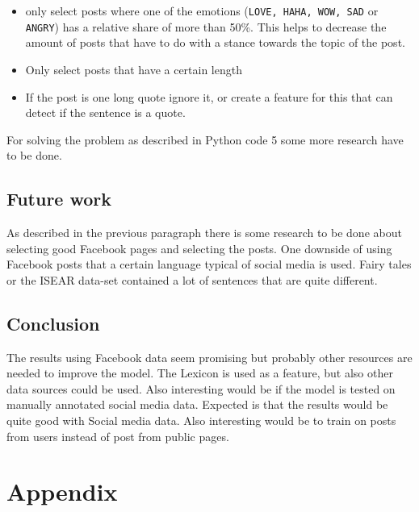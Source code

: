 \documentclass[
10pt, %
a4paper, %
oneside, %
headinclude,footinclude, %
BCOR5mm, %
]{scrartcl}
\begin{document}
\begin{itemize}
\item only select posts where one of the emotions (\texttt{LOVE, HAHA, WOW, SAD} or \texttt{ANGRY}) has a relative share of more than 50\%. This helps to decrease the amount of posts that have to do with a stance towards the topic of the post.
\item Only select posts that have a certain length
\item If the post is one long quote ignore it, or create a feature for this that can detect if the sentence is a quote.
\end{itemize}
For solving the problem as described in Python code 5 some more research have to be done. 


\subsection{Future work}
As described in the previous paragraph there is some research to be done about selecting good Facebook pages and selecting the posts. One downside of using Facebook posts that a certain language typical of social media is used. Fairy tales or the ISEAR data-set contained a lot of sentences that are quite different.

\subsection{Conclusion}
The results using Facebook data seem promising but probably other resources are needed to improve the model. The Lexicon is used as a feature, but also other data sources could be used. Also interesting would be if the model is tested on manually annotated social media data. Expected is that the results would be quite good with Social media data. Also interesting would be to train on posts from users instead of post from public pages.

\newpage
\nocite{*}



\newpage
\section{Appendix}
\renewcommand{\thesubsection}{\Alph{subsection}}
\end{document}
